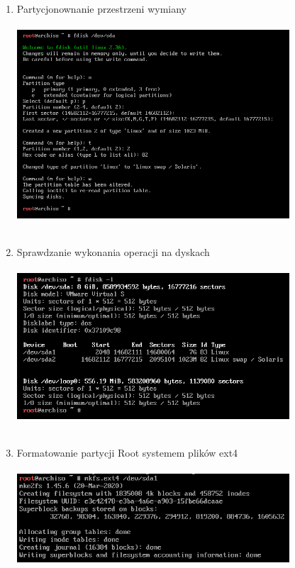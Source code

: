 \documentclass[10pt,a4paper]{article}
\begin{document}
\begin{enumerate}
\item Partycjonownanie przestrzeni wymiany\\\\
\includegraphics[width=0.8\textwidth, center]{arch4.png}\\\\
\newpage
\item Sprawdzanie wykonania operacji na dyskach\\\\
\includegraphics[width=0.8\textwidth, center]{arch5.png}\\\\
\item Formatowanie partycji Root systemem plików ext4\\\\
\includegraphics[width=0.8\textwidth, center]{arch6.png}\\\\

\end{enumerate}
\end{document}
